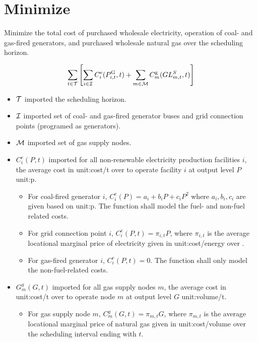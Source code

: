 \section{Minimize}
Minimize the total cost of purchased wholesale electricity, operation of coal-
and gas-fired generators, and purchased wholesale natural gas over the
scheduling horizon.

\begin{equation*}
  \sum_{t \in \mathcal T} \left[ \sum_{i \in \mathcal I} C^{\text{e}}_i (P^{\text{G}}_{i,t},
    t) + \sum_{m \in \mathcal M} C^{\text{g}}_m (GL^S_{m,t}, t) \right]
\end{equation*}


\begin{itemize}
\item $\mathcal T$ \gls{imported} the scheduling horizon.

\item $\mathcal I$ \gls{imported} set of coal- and gas-fired generator buses and grid
  connection points (programed as generators).

\item $\mathcal M$ \gls{imported} set of gas supply nodes.

\item $C^e_i(P, t)$ \gls{imported} for all non-renewable electricity production
  facilities $i$, the average cost in \gls{unit:cost/t} over \intervaloft{} to
  operate facility $i$ at output level $P$ \gls{unit:p}.
  \begin{itemize}

  \item For coal-fired generator $i$, $C^e_i(P) = a_i + b_iP + c_iP^2$ where
    $a_i, b_i, c_i$ are given based on \gls{unit:p}. The function shall model
    the fuel- and non-fuel related costs.

  \item For grid connection point $i$, $C^e_i(P, t) = \pi_{i,t}P$, where
    $\pi_{i,t}$ is the average locational marginal price of electricity given in
    \gls{unit:cost/energy} over \intervaloft{}.

  \item For gas-fired generator $i$, $C^e_i(P, t) = 0$. The function shall only
    model the non-fuel-related costs.
  \end{itemize}

\item $G^g_m(G, t)$ \gls{imported} for all gas supply nodes $m$, the average
  cost in \gls{unit:cost/t} over \intervaloft{} to operate node $m$ at output
  level $G$ \gls{unit:volume/t}.
  \begin{itemize}
  \item For gas supply node $m$, $C_m^g(G, t) = \pi_{m,t} G$, where $\pi_{m,t}$
    is the average locational marginal price of natural gas given in
    \gls{unit:cost/volume} over the scheduling interval ending with $t$.
  \end{itemize}


\end{itemize}
